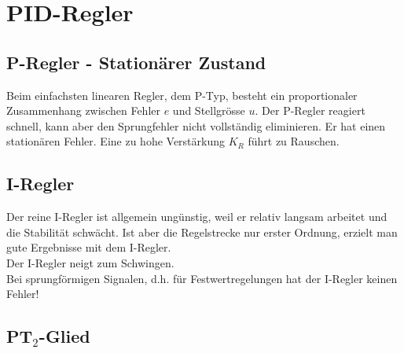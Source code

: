 \section{PID-Regler }

	\subsection{P-Regler - Stationärer Zustand }
		Beim einfachsten linearen Regler, dem P-Typ, besteht ein proportionaler
		Zusammenhang zwischen Fehler $e$ und Stellgrösse $u$.
		Der P-Regler reagiert schnell, kann aber den Sprungfehler nicht vollständig
		eliminieren. Er hat einen stationären Fehler. Eine zu hohe Verstärkung $K_R$ führt
    zu Rauschen.


	\subsection{I-Regler }
		Der reine I-Regler ist allgemein ungünstig, weil er relativ langsam arbeitet
		und die Stabilität schwächt. Ist aber die Regelstrecke nur erster Ordnung,
		erzielt man gute Ergebnisse mit dem I-Regler.\\
		Der I-Regler neigt zum Schwingen.\\
		Bei sprungförmigen Signalen, d.h. für Festwertregelungen hat der I-Regler
		keinen Fehler!


	\subsection{PT$_2$-Glied }
